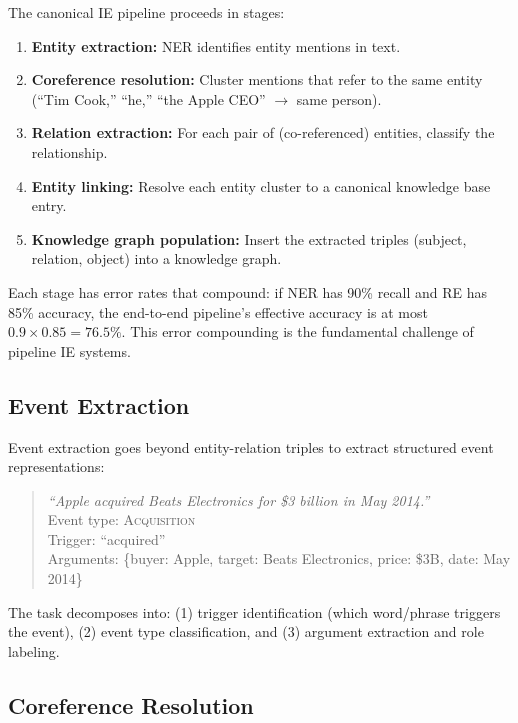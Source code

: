 The canonical IE pipeline proceeds in stages:

\begin{enumerate}[label=\textbf{\arabic*.}]
    \item \textbf{Entity extraction:} NER identifies entity mentions in text.
    \item \textbf{Coreference resolution:} Cluster mentions that refer to the same entity
          (``Tim Cook,'' ``he,'' ``the Apple CEO'' $\to$ same person).
    \item \textbf{Relation extraction:} For each pair of (co-referenced) entities, classify
          the relationship.
    \item \textbf{Entity linking:} Resolve each entity cluster to a canonical knowledge base
          entry.
    \item \textbf{Knowledge graph population:} Insert the extracted triples
          (subject, relation, object) into a knowledge graph.
\end{enumerate}

Each stage has error rates that compound: if NER has 90\% recall and RE has 85\% accuracy,
the end-to-end pipeline's effective accuracy is at most $0.9 \times 0.85 = 76.5\%$.  This
error compounding is the fundamental challenge of pipeline IE systems.

\subsection{Event Extraction}

Event extraction goes beyond entity-relation triples to extract structured event
representations:

\begin{quote}
\emph{``Apple acquired Beats Electronics for \$3 billion in May 2014.''}\\
Event type: \textsc{Acquisition}\\
Trigger: ``acquired''\\
Arguments: \{buyer: Apple, target: Beats Electronics, price: \$3B, date: May 2014\}
\end{quote}

The task decomposes into: (1) trigger identification (which word/phrase triggers the event),
(2) event type classification, and (3) argument extraction and role labeling.

\subsection{Coreference Resolution}

